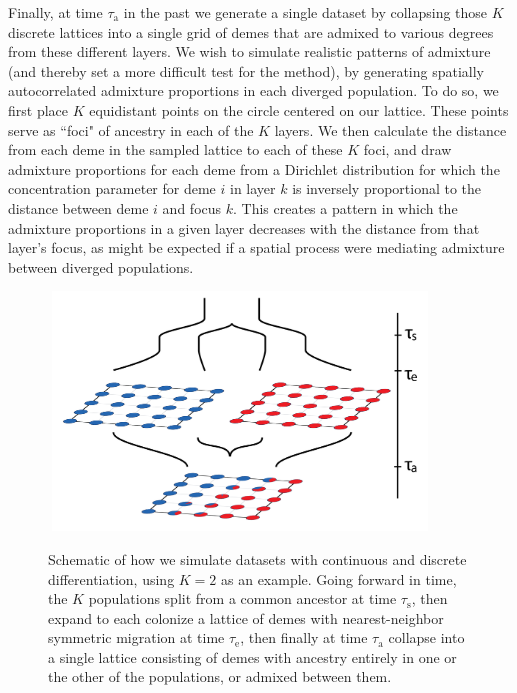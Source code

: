 \documentclass[10pt,letterpaper]{article}
\begin{document}
Finally, at time $\tau_{\text{a}}$ in the past 
we generate a single dataset 
by collapsing those $K$ discrete lattices into a single grid of demes 
that are admixed to various degrees from these different layers. 
We wish to simulate realistic patterns of admixture 
(and thereby set a more difficult test for the method), 
by generating spatially autocorrelated admixture proportions 
in each diverged population.
To do so, we first place $K$ equidistant points on the circle centered on our lattice.  
These points serve as ``foci" of ancestry in each of the $K$ layers.  
We then calculate the distance from each deme in the sampled lattice to each of these $K$ foci, 
and draw admixture proportions for each deme 
from a Dirichlet distribution for which the concentration parameter 
for deme $i$ in layer $k$ is inversely proportional to the distance between deme $i$ and focus $k$. 
This creates a pattern in which the admixture proportions in a given layer decreases 
with the distance from that layer's focus, 
as might be expected if a spatial process were mediating admixture between diverged populations.

\begin{figure}
	\centering
		{\includegraphics[width=4in,height=2.5in]{figs/sims/sim_setup.png}}
		\caption{Schematic of how we simulate datasets with continuous and discrete differentiation, using $K=2$ as an example.  
			    Going forward in time, the $K$ populations split from a common ancestor at time $\tau_{\text{s}}$,
			    then expand to each  colonize a lattice of demes with nearest-neighbor symmetric migration at time $\tau_{\text{e}}$,
			    then finally at time $\tau_{\text{a}}$ collapse into a single lattice consisting of demes 
			    with ancestry entirely in one or the other of the populations,
			    or admixed between them.
			    }\label{sim_setup}
\end{figure}

\clearpage
\newpage
\end{document}

